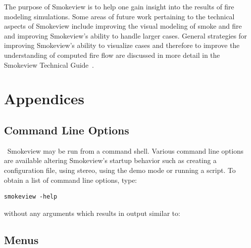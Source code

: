 \documentclass[11pt,twoside]{book}
\begin{document}
The purpose of Smokeview is to help one gain insight into the results
of fire modeling simulations.
Some areas of future work pertaining to the technical aspects of
Smokeview include improving the visual modeling of smoke and fire
and improving Smokeview's ability to handle larger cases.
General strategies for improving Smokeview's ability to visualize
cases and therefore to improve the understanding of computed fire
flow are discussed in more detail in the
Smokeview Technical Guide~\cite{Smokeview_Tech_Guide}.


\printbibliography[heading=bibintoc,title={References}]



\part{Appendices}
\appendix
{}


\chapter{Command Line Options}
\label{sectioncommand}\ Smokeview may be run from a command shell.
Various command line options are available altering Smokeview's
startup behavior such as creating a configuration file, using
stereo, using the demo mode or running a script. To obtain a list
of command line options, type:
\begin{lstlisting}
smokeview -help
\end{lstlisting}
\noindent without any arguments which results in output similar to:\\




\chapter{Menus}
\label{sectionmenu}
\end{document}
